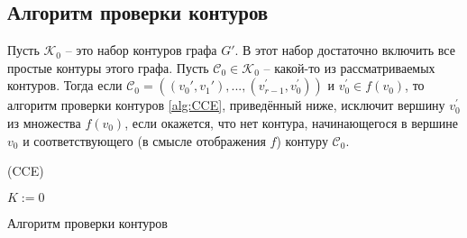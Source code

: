 \subsection{Алгоритм проверки контуров}

Пусть $\mathcal{K}_0$ -- это набор контуров графа $G'$. В этот набор достаточно включить все простые контуры этого графа. 
Пусть $\mathcal{C}_0 \in \mathcal{K}_0$ -- какой-то из рассматриваемых контуров. Тогда если $\mathcal{C}_0 = ((v_0', v_1'), ..., (v_{r-1}^{\prime}, v_0^{\prime}))$ и $v_0^{\prime} \in f(v_0)$, то алгоритм проверки контуров \ref{alg:CCE}, приведённый ниже, исключит вершину $v_0^{\prime}$ из множества $f(v_0)$, если окажется, что нет контура, начинающегося в вершине $v_0$ и соответствующего (в смысле отображения $f$) контуру $\mathcal{C}_0$.

\begin{algorithm}[H]
	\Large
	\Begin(CCE){
		$K := 0$
		
	}

	\caption{Алгоритм проверки контуров}
	\label{alg:CCE}
\end{algorithm}

